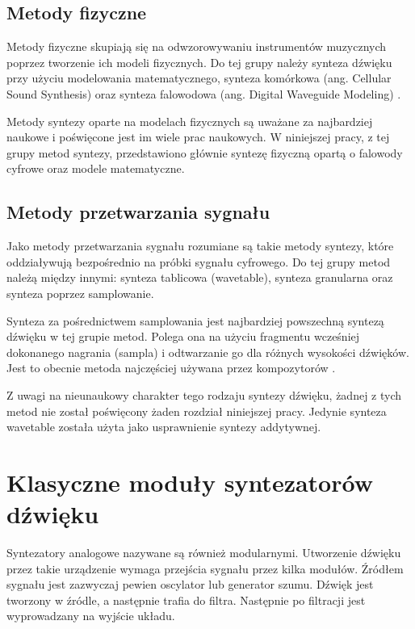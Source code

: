\subsection{Metody fizyczne}
Metody fizyczne skupiają się na odwzorowywaniu instrumentów muzycznych poprzez tworzenie ich modeli fizycznych. Do tej grupy należy synteza dźwięku przy użyciu modelowania matematycznego, synteza komórkowa (ang. Cellular Sound Synthesis) oraz synteza falowodowa (ang. Digital Waveguide Modeling) \cite{czyzewski_dzwiek_cyfrowy}.

Metody syntezy oparte na modelach fizycznych są uważane za najbardziej naukowe i poświęcone jest im wiele prac naukowych. W niniejszej pracy, z tej grupy metod syntezy, przedstawiono głównie syntezę fizyczną opartą o falowody cyfrowe oraz modele matematyczne.

\subsection{Metody przetwarzania sygnału}
Jako metody przetwarzania sygnału rozumiane są takie metody syntezy, które oddziaływują bezpośrednio na próbki sygnału cyfrowego. Do tej grupy metod należą między innymi: synteza tablicowa (wavetable), synteza granularna oraz synteza poprzez samplowanie.

Synteza za pośrednictwem samplowania jest najbardziej powszechną syntezą dźwięku w tej grupie metod. Polega ona na użyciu fragmentu wcześniej dokonanego nagrania (sampla) i odtwarzanie go dla różnych wysokości dźwięków. Jest to obecnie metoda najczęściej używana przez kompozytorów \cite{misra_cook_przetw_syg}.

Z uwagi na nieunaukowy charakter tego rodzaju syntezy dźwięku, żadnej z tych metod nie został poświęcony żaden rozdział niniejszej pracy. Jedynie synteza wavetable została użyta jako usprawnienie syntezy addytywnej.


\section{Klasyczne moduły syntezatorów dźwięku}
Syntezatory analogowe nazywane są również modularnymi. Utworzenie dźwięku przez takie urządzenie wymaga przejścia sygnału przez kilka modułów. Źródłem sygnału jest zazwyczaj pewien oscylator lub generator szumu. Dźwięk jest tworzony w źródle, a następnie trafia do filtra. Następnie po filtracji jest wyprowadzany na wyjście układu.

